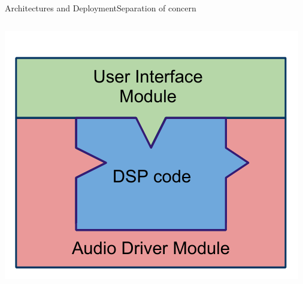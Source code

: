 \begin{frame}{Architectures and Deployment}{Separation of concern}
\begin{columns}[t]
\begin{column}{0.75\textwidth}
	\begin{center}
	\includegraphics[height=0.2\textheight]{images/FaustArchitectureComplete}
	\end{center}
\end{column}
\end{columns}

\end{frame}



